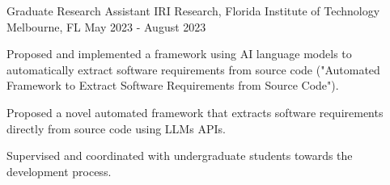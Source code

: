 \begin{cventries}
{\begin{cvitems}
\end{cvitems}
}
\cventry
{Graduate Research Assistant}
{IRI Research, Florida Institute of Technology}
{Melbourne, FL}
{May 2023 - August 2023}
{
\begin{cvitems}
\item Proposed and implemented a framework using AI language models to automatically extract software requirements from source code ("Automated Framework to Extract Software Requirements from Source Code").
\item Proposed a novel automated framework that extracts software requirements directly from source code using LLMs APIs.
\item Supervised and coordinated with undergraduate students towards the development process.
\end{cvitems}
}

\end{cventries}
